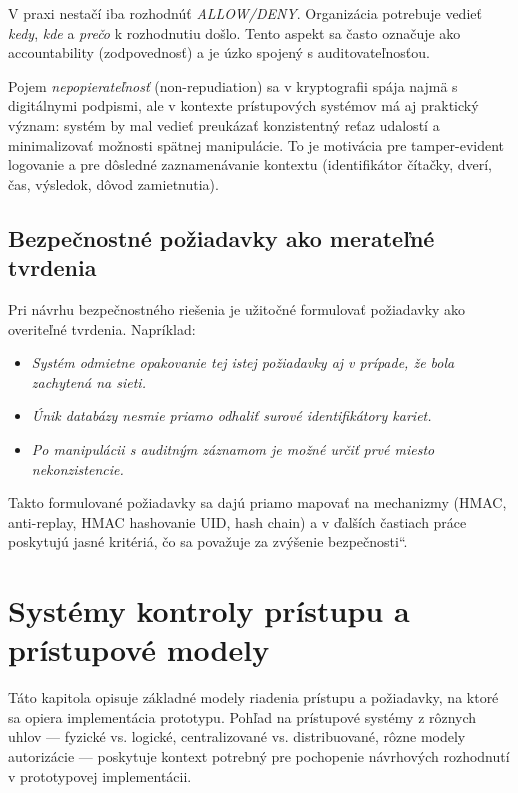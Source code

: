 \documentclass[journal,a4paper,onecolumn]{IEEEtran}
\newcommand{\uv}[1]{\quotedblbase#1\textquotedblleft}
\begin{document}
V praxi nestačí iba rozhodnúť \emph{ALLOW/DENY}. Organizácia potrebuje vedieť \emph{kedy}, \emph{kde} a \emph{prečo} k rozhodnutiu došlo. Tento aspekt sa často označuje ako accountability (zodpovednosť) a je úzko spojený s auditovateľnosťou.

Pojem \emph{nepopierateľnosť} (non-repudiation) sa v kryptografii spája najmä s digitálnymi podpismi, ale v kontexte prístupových systémov má aj praktický význam: systém by mal vedieť preukázať konzistentný reťaz udalostí a minimalizovať možnosti spätnej manipulácie. To je motivácia pre tamper-evident logovanie a pre dôsledné zaznamenávanie kontextu (identifikátor čítačky, dverí, čas, výsledok, dôvod zamietnutia).

\subsection{Bezpečnostné požiadavky ako merateľné tvrdenia}

Pri návrhu bezpečnostného riešenia je užitočné formulovať požiadavky ako overiteľné tvrdenia. Napríklad:

\begin{itemize}[leftmargin=*,itemsep=2pt]
  \item \emph{Systém odmietne opakovanie tej istej požiadavky aj v prípade, že bola zachytená na sieti.}
  \item \emph{Únik databázy nesmie priamo odhaliť surové identifikátory kariet.}
  \item \emph{Po manipulácii s auditným záznamom je možné určiť prvé miesto nekonzistencie.}
\end{itemize}

Takto formulované požiadavky sa dajú priamo mapovať na mechanizmy (HMAC, anti-replay, HMAC hashovanie UID, hash chain) a v ďalších častiach práce poskytujú jasné kritériá, čo sa považuje za \uv{zvýšenie bezpečnosti}.
\section{Systémy kontroly prístupu a prístupové modely}

Táto kapitola opisuje základné modely riadenia prístupu a požiadavky, na ktoré sa opiera implementácia prototypu. Pohľad na prístupové systémy z rôznych uhlov --- fyzické vs. logické, centralizované vs. distribuované, rôzne modely autorizácie --- poskytuje kontext potrebný pre pochopenie návrhových rozhodnutí v prototypovej implementácii.
\end{document}
